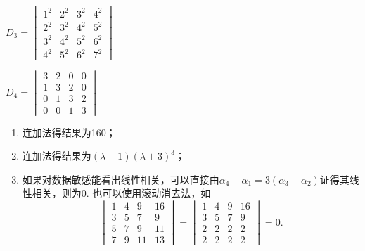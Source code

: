 \begin{exercise}
\begin{exgroup}
\begin{enumerate}
\begin{multicols}{2}
                \item $ D_3=\begin{vmatrix}
                        1^{2} & 2^{2} & 3^{2} & 4^{2} \\
                        2^{2} & 3^{2} & 4^{2} & 5^{2} \\
                        3^{2} & 4^{2} & 5^{2} & 6^{2} \\
                        4^{2} & 5^{2} & 6^{2} & 7^{2}
                    \end{vmatrix} $

                \item $ D_4=\begin{vmatrix}
                        3 & 2 & 0 & 0 \\
                        1 & 3 & 2 & 0 \\
                        0 & 1 & 3 & 2 \\
                        0 & 0 & 1 & 3
                    \end{vmatrix} $
            \end{multicols} \end{enumerate}
        \begin{answer}
            \begin{enumerate}
                \item 连加法得结果为160；

                \item 连加法得结果为$(\lambda-1)(\lambda+3)^3$；

                \item 如果对数据敏感能看出线性相关，可以直接由$\alpha_4-\alpha_1=3(\alpha_3-\alpha_2)$证得其线性相关，则为0. 也可以使用滚动消去法，如\[
                          \begin{vmatrix}
                              1 & 4 & 9  & 16 \\
                              3 & 5 & 7  & 9  \\
                              5 & 7 & 9  & 11 \\
                              7 & 9 & 11 & 13
                          \end{vmatrix}=\begin{vmatrix}
                              1 & 4 & 9 & 16 \\
                              3 & 5 & 7 & 9  \\
                              2 & 2 & 2 & 2  \\
                              2 & 2 & 2 & 2
                          \end{vmatrix}=0.\]


\end{enumerate}
\end{answer}
\end{exgroup}
\end{exercise}
